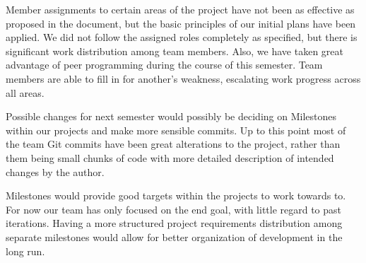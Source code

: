 \documentclass[11pt]{article}
\begin{document}
Member assignments to certain areas of the project have not been as 
effective as proposed in the document, but the basic principles of 
our initial plans have been applied. We did not follow the assigned 
roles completely as specified, but there is significant work 
distribution among team members. Also, we have taken great advantage 
of peer programming during the course of this semester. Team members 
are able to fill in for another's weakness, escalating work progress 
across all areas. 

Possible changes for next semester would possibly be deciding on 
Milestones within our projects and make more sensible commits. Up to 
this point most of the team Git commits have been great alterations 
to the project, rather than them being small chunks of code with 
more detailed description of intended changes by the author. 

Milestones would provide good targets within the projects to work 
towards to.  For now our team has only focused on the end goal, with 
little regard to past iterations. Having a more structured project 
requirements distribution among separate milestones would allow for 
better organization of development in the long run. 
\end{document}
